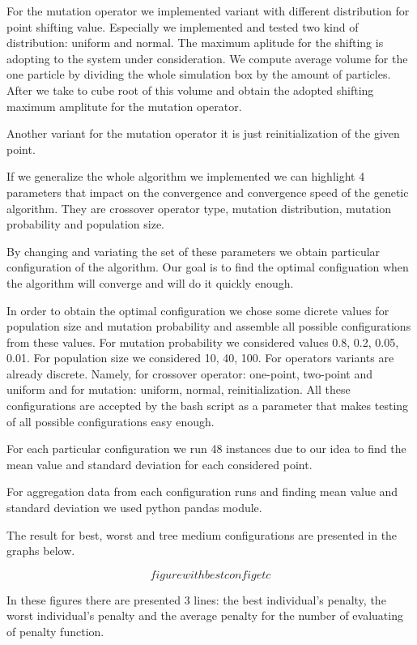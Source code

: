 \documentclass{article}
\begin{document}
For the mutation operator we implemented variant with different distribution for point shifting value. Especially we implemented and tested two kind of distribution: uniform and normal. The maximum aplitude for the shifting is adopting to the system under consideration. We compute average volume for the one particle by dividing the whole simulation box by the amount of particles. After we take to cube root of this volume and obtain the adopted shifting maximum amplitute for the mutation operator.

Another variant for the mutation operator it is just reinitialization of the given point. 

If we generalize the whole algorithm we implemented we can highlight 4 parameters that impact on the convergence and convergence speed of the genetic algorithm. They are crossover operator type, mutation distribution, mutation probability and population size.

By changing and variating the set of these parameters we obtain particular configuration of the algorithm. Our goal is to find the optimal configuation when the algorithm will converge and will do it quickly enough.

In order to obtain the optimal configuration we chose some dicrete values for population size and mutation probability and assemble all possible configurations from these values. For mutation probability we considered values 0.8, 0.2, 0.05, 0.01. For population size we considered 10, 40, 100. For operators variants are already discrete. Namely, for crossover operator: one-point, two-point and uniform and for mutation: uniform, normal, reinitialization. All these configurations are accepted by the bash script as a parameter that makes testing of all possible configurations easy enough.

For each particular configuration we run 48 instances due to our idea to find the mean value and standard deviation for each considered point.

For aggregation data from each configuration runs and finding mean value and standard deviation we used python pandas module.

The result for best, worst and tree medium configurations are presented in the graphs below.

\[figure with best config etc\]

In these figures there are presented 3 lines: the best individual's penalty, the worst individual's penalty and the average penalty for the number of evaluating of penalty function.
\end{document}
